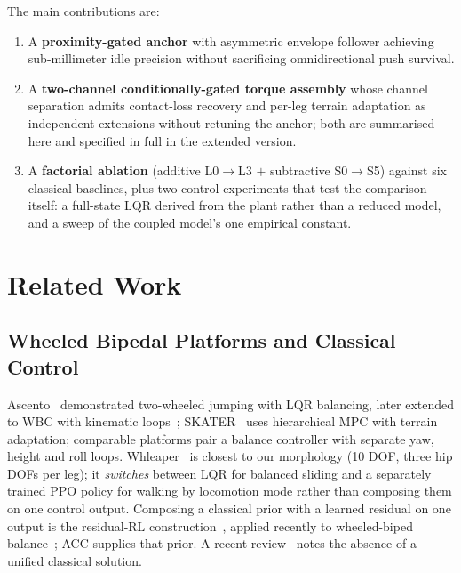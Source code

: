 \documentclass{jcd}
\begin{document}
The main contributions are:
\begin{enumerate}
    \item A \textbf{proximity-gated anchor} with asymmetric envelope follower achieving sub-millimeter idle precision without sacrificing omnidirectional push survival.
    \item A \textbf{two-channel conditionally-gated torque assembly} whose channel separation admits contact-loss recovery and per-leg terrain adaptation as independent extensions without retuning the anchor; both are summarised here and specified in full in the extended version.
    \item A \textbf{factorial ablation} (additive L0$\rightarrow$L3 $+$ subtractive S0$\rightarrow$S5) against six classical baselines, plus two control experiments that test the comparison itself: a full-state LQR derived from the plant rather than a reduced model, and a sweep of the coupled model's one empirical constant.
\end{enumerate}


\section{Related Work}

\subsection{Wheeled Bipedal Platforms and Classical Control}
Ascento~\citep{klemm2019ascento} demonstrated two-wheeled jumping with LQR balancing, later extended to WBC with kinematic loops~\citep{klemm2020lqrwbc}; SKATER~\citep{skater2024} uses hierarchical MPC with terrain adaptation; comparable platforms pair a balance controller with separate yaw, height and roll loops. Whleaper~\citep{whleaper2024} is closest to our morphology (10 DOF, three hip DOFs per leg); it \emph{switches} between LQR for balanced sliding and a separately trained PPO policy for walking by locomotion mode rather than composing them on one control output. Composing a classical prior with a learned residual on one output is the residual-RL construction~\citep{johannink2019residual}, applied recently to wheeled-biped balance~\citep{zhang2025residualwbr}; ACC supplies that prior. A recent review~\citep{liu2024review} notes the absence of a unified classical solution.
\end{document}
